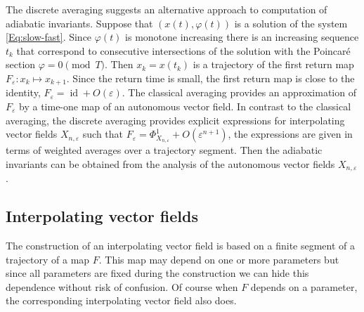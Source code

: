 \documentclass[a4paper,12pt]{article}
\begin{document}
The discrete averaging suggests an alternative approach to computation of adiabatic invariants.
Suppose that $(x(t),\varphi(t))$ is a solution of the system \eqref{Eq:slow-fast}. Since $\varphi(t)$ is monotone increasing there is an increasing sequence $t_k$ that correspond to consecutive intersections of the solution
with the Poincaré section $\varphi=0\pmod{T}$. Then $x_k=x(t_k)$
is a trajectory of the first return map $F_\varepsilon:x_{k}\mapsto x_{k+1}$.
Since the return time is small, the first return map  is close to the identity, $F_\varepsilon=\operatorname{id}+O(\varepsilon)$.
The classical averaging provides an
approximation of $F_\varepsilon$ by a time-one map
of an autonomous vector field. 
In contrast to the classical averaging, 
the discrete averaging provides explicit expressions for interpolating vector fields $X_{n,\varepsilon}$ such that $F_\varepsilon=\Phi^1_{X_{n,\varepsilon}}+O(\varepsilon^{n+1})$,
the expressions are  given 
in terms of weighted averages over a trajectory segment.
Then the adiabatic invariants can be obtained from the analysis of the autonomous
vector fields $X_{n,\varepsilon}$.


\subsection{Interpolating vector fields}

The construction of an interpolating vector field is based on a 
finite segment of a trajectory of a map $F$. This map may depend
on one or more parameters but since all parameters are fixed during
the construction we can hide this dependence without risk of confusion.
Of course when $F$ depends on a parameter,  the corresponding interpolating vector field also does.
\end{document}
